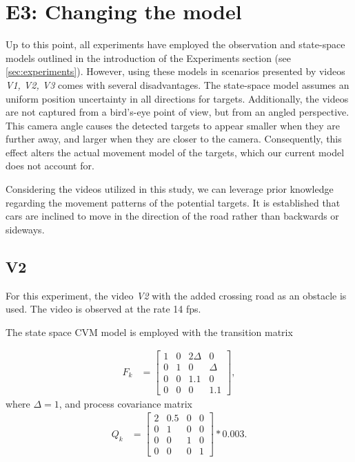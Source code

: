 \section{E3: Changing the model}
\renewcommand{\Ex}{E3}
Up to this point, all experiments have employed the observation and state-space models outlined in the introduction
of the Experiments section (see \ref{sec:experiments}). However, using these models in scenarios presented by videos \textit{V1, V2, V3} comes with several disadvantages. The state-space model assumes an uniform position uncertainty in all directions for targets. Additionally, the videos are not captured from a bird's-eye point of view, but from an angled perspective. This camera angle causes the detected targets to appear smaller when they are further away, and larger when they are closer to the camera. Consequently, this effect alters the actual movement model of the targets, which our current model does not account for.


Considering the videos utilized in this study, we can leverage prior knowledge regarding the movement patterns of the potential targets. It is established that cars are inclined to move in the
direction
of the road rather than backwards or sideways.
\subsection{V2}
\renewcommand{\Vs}{V2}
For this experiment, the video \textit{V2} with the added crossing road as an obstacle is used. The video is observed
at the rate 14 fps.

The state space CVM model is employed with the transition matrix

\begin{align}
    F_k &=
    \begin{bmatrix}
        1 & 0 & 2\Delta & 0\\
        0 & 1 & 0 & \Delta \\
        0 & 0 & 1.1 & 0 \\
        0 & 0 & 0 & 1.1
    \end{bmatrix},
\end{align}
where $\Delta = 1$,
and process covariance matrix
\begin{align}
    Q_k &=
    \begin{bmatrix}
        2 & 0.5 & 0 & 0\\
        0 & 1 & 0 & 0 \\
        0 & 0 & 1 & 0 \\
        0 & 0 & 0 & 1
    \end{bmatrix}
    * 0.003.
    \label{eq:exp_E3-V2_Q}
\end{align}

